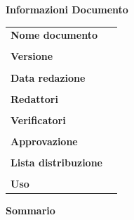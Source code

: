 \begin{center}
\vspace{1cm}
	\textbf{\Large Informazioni Documento} \\[10pt]
	\begin{longtable}{l|p{150pt}}
		\textbf{Nome documento} & \documentName \\ & \\
		\textbf{Versione} & \documentVersion \\ & \\
		\textbf{Data redazione} & \documentDate \\ & \\
		\textbf{Redattori} & \parbox[t]{\textwidth}{\documentEditors} \\ & \\
		\textbf{Verificatori} & \parbox{\textwidth}{\documentVerifiers} \\ & \\
		\textbf{Approvazione} & \parbox{\textwidth}{\documentApprovers} \\ & \\
		\textbf{Lista distribuzione} & \parbox{\textwidth}{\documentDistributionList} \\ & \\
		\textbf{Uso} & \parbox{\textwidth}{\documentUsage} \\
	\end{longtable}
	\vspace{10pt}
		\textbf{\Large Sommario} \\
		\documentSummary
\end{center}
